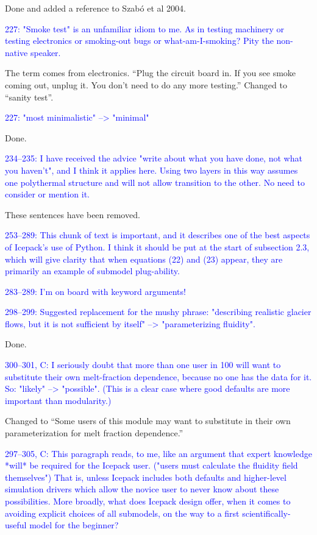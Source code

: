 \documentclass{article}
\theoremstyle{definition}
\theoremstyle{plain}
\begin{document}
Done and added a reference to Szab\'o et al 2004.

\textcolor{blue}{227:  "Smoke test" is an unfamiliar idiom to me.  As in testing machinery or testing electronics or smoking-out bugs or what-am-I-smoking?  Pity the non-native speaker.}

The term comes from electronics.
``Plug the circuit board in.
If you see smoke coming out, unplug it.
You don't need to do any more testing.''
Changed to ``sanity test''.

\textcolor{blue}{227:  "most minimalistic" --> "minimal"}

Done.

\textcolor{blue}{234--235:  I have received the advice "write about what you have done, not what you haven't", and I think it applies here.  Using two layers in this way assumes one polythermal structure and will not allow transition to the other.  No need to consider or mention it.}

These sentences have been removed.

\textcolor{blue}{253--289:  This chunk of text is important, and it describes one of the best aspects of Icepack's use of Python.  I think it should be put at the start of subsection 2.3, which will give clarity that when equations (22) and (23) appear, they are primarily an example of submodel plug-ability.}

\textcolor{blue}{283--289:  I'm on board with keyword arguments!}

\textcolor{blue}{298--299:  Suggested replacement for the mushy phrase: "describing realistic glacier flows, but it is not sufficient by itself" --> "parameterizing fluidity".}

Done.

\textcolor{blue}{300--301, C:  I seriously doubt that more than one user in 100 will want to substitute their own melt-fraction dependence, because no one has the data for it.  So: "likely" --> "possible".  (This is a clear case where good defaults are more important than modularity.)}

Changed to ``Some users of this module may want to substitute in their own parameterization for melt fraction dependence.''

\textcolor{blue}{297--305, C:  This paragraph reads, to me, like an argument that expert knowledge *will* be required for the Icepack user.  ("users must calculate the fluidity field themselves")  That is, unless Icepack includes both defaults and higher-level simulation drivers which allow the novice user to never know about these possibilities.  More broadly, what does Icepack design offer, when it comes to avoiding explicit choices of all submodels, on the way to a first scientifically-useful model for the beginner?}
\end{document}
